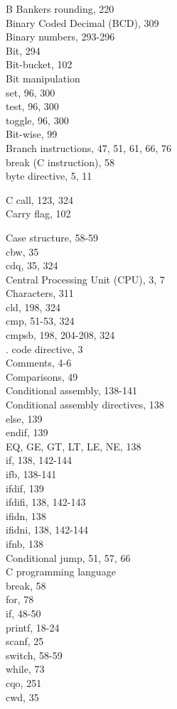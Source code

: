 \documentclass[10pt]{book}
\begin{document}
B
Bankers rounding, 220\\
Binary Coded Decimal (BCD), 309\\
Binary numbers, 293-296\\
Bit, 294\\
Bit-bucket, 102\\
Bit manipulation\\
set, 96, 300\\
test, 96, 300\\
toggle, 96, 300\\
Bit-wise, 99\\
Branch instructions, 47, 51, 61, 66, 76\\
break (C instruction), 58\\
byte directive, 5, 11

C
call, 123, 324\\
Carry flag, 102

Case structure, 58-59\\
cbw, 35\\
cdq, 35, 324\\
Central Processing Unit (CPU), 3, 7\\
Characters, 311\\
cld, 198, 324\\
cmp, 51-53, 324\\
cmpsb, 198, 204-208, 324\\
. code directive, 3\\
Comments, 4-6\\
Comparisons, 49\\
Conditional assembly, 138-141\\
Conditional assembly directives, 138\\
else, 139\\
endif, 139\\
EQ, GE, GT, LT, LE, NE, 138\\
if, 138, 142-144\\
ifb, 138-141\\
ifdif, 139\\
ifdifi, 138, 142-143\\
ifidn, 138\\
ifidni, 138, 142-144\\
ifnb, 138\\
Conditional jump, 51, 57, 66\\
C programming language\\
break, 58\\
for, 78\\
if, 48-50\\
printf, 18-24\\
scanf, 25\\
switch, 58-59\\
while, 73\\
cqo, 251\\
cwd, 35
\end{document}

